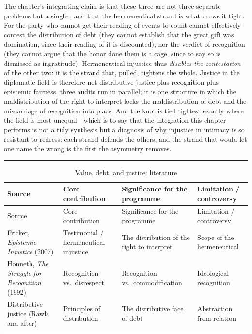 \documentclass[11pt,a4paper]{article}
\newcommand{\emb}[1]{\textcolor{rose}{\oldtextbf{#1}}}
\newcommand{\goldrule}{\noindent\textcolor{gold}{\rule{\linewidth}{0.6pt}}\par\vspace{0.4em}}
\begin{document}
The chapter's integrating claim is that these three are not three separate problems but a single \emb{knot}, and that the hermeneutical strand is what draws it tight. For the party who cannot get their reading of events to count cannot effectively contest the distribution of debt (they cannot establish that the great gift was domination, since their reading of it is discounted), nor the verdict of recognition (they cannot argue that the honor done them is a cage, since to say so is dismissed as ingratitude). Hermeneutical injustice thus \emph{disables the contestation} of the other two: it is the strand that, pulled, tightens the whole. Justice in the diplomatic field is therefore not distributive justice plus recognition plus epistemic fairness, three audits run in parallel; it is one structure in which the maldistribution of the right to interpret locks the maldistribution of debt and the miscarriage of recognition into place. And the knot is tied tightest exactly where the field is most unequal---which is to say that the integration this chapter performs is not a tidy synthesis but a diagnosis of why injustice in intimacy is so resistant to redress: each strand defends the others, and the strand that would let one name the wrong is the first the asymmetry removes.

\goldrule
\footnotesize
\begin{longtable}{Y Y Y Y}
\caption{Value, debt, and justice: literature}\label{p07:tab:justice}\\
\toprule
{}
Source & Core contribution & Significance for the programme & Limitation / controversy \\
\midrule
\endfirsthead
\toprule
{}
Source & Core contribution & Significance for the programme & Limitation / controversy \\
\midrule
\endhead
Fricker, \emph{Epistemic Injustice} (2007) & Testimonial / hermeneutical injustice & The distribution of the right to interpret & Scope of the hermeneutical \\
Honneth, \emph{The Struggle for Recognition} (1992) & Recognition vs.\ disrespect & Recognition vs.\ commodification & Ideological recognition \\
Distributive justice (Rawls and after) & Principles of distribution & The distributive face of debt & Abstraction from relation \\
\bottomrule
\end{longtable}

\end{document}
